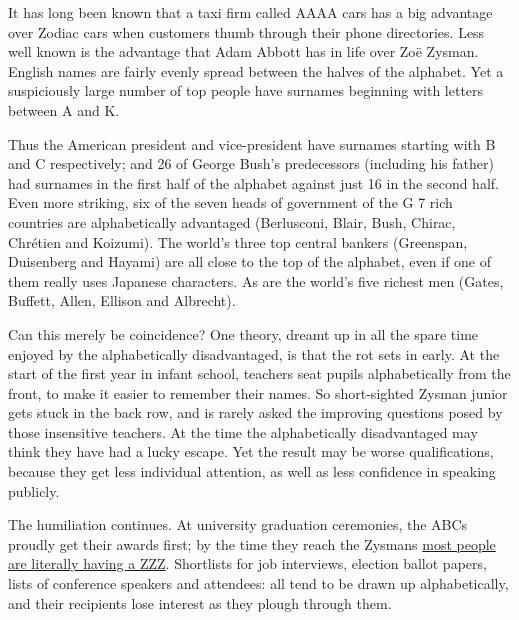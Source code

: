 It has long been known that a taxi firm called AAAA cars has a big
advantage over Zodiac cars when customers thumb through their phone
directories. Less well known is the advantage that Adam Abbott has in
life over Zoë Zysman. English names are fairly evenly spread between the
halves of the alphabet. Yet a suspiciously large number of top people
have surnames beginning with letters between A and K.

Thus the American president and vice-president have surnames starting
with B and C respectively; and 26 of George Bush's predecessors
(including his father) had surnames in the first half of the alphabet
against just 16 in the second half. Even more striking, six of the seven
heads of government of the G 7 rich countries are alphabetically
advantaged (Berlusconi, Blair, Bush, Chirac, Chrétien and Koizumi). The
world's three top central bankers (Greenspan, Duisenberg and Hayami) are
all close to the top of the alphabet, even if one of them really uses
Japanese characters. As are the world's five richest men (Gates,
Buffett, Allen, Ellison and Albrecht).

Can this merely be coincidence? One theory, dreamt up in all the spare
time enjoyed by the alphabetically disadvantaged, is that the rot sets
in early. At the start of the first year in infant school, teachers seat
pupils alphabetically from the front, to make it easier to remember
their names. So short-sighted Zysman junior gets stuck in the back row,
and is rarely asked the improving questions posed by those insensitive
teachers. At the time the alphabetically disadvantaged may think they
have had a lucky escape. Yet the result may be worse qualifications,
because they get less individual attention, as well as less confidence
in speaking publicly.

The humiliation continues. At university graduation ceremonies, the ABCs
proudly get their awards first; by the time they reach the Zysmans \uline{most
people are literally having a ZZZ}. Shortlists for job interviews,
election ballot papers, lists of conference speakers and attendees: all
tend to be drawn up alphabetically, and their recipients lose interest
as they plough through them.


